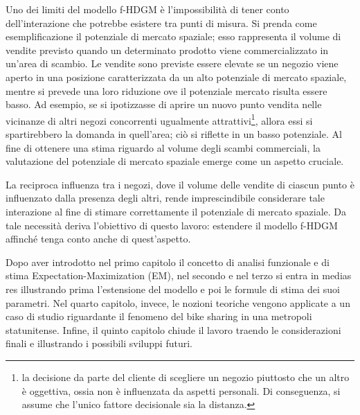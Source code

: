 \par Uno dei limiti del modello f-HDGM è l'impossibilità di tener conto dell'interazione che potrebbe esistere tra punti di misura. Si prenda come esemplificazione il potenziale di mercato spaziale; esso rappresenta il volume di vendite previsto quando un determinato prodotto viene commercializzato in un'area di scambio. Le vendite sono previste essere elevate se un negozio viene aperto in una posizione caratterizzata da un alto potenziale di mercato spaziale, mentre si prevede una loro riduzione ove il potenziale mercato risulta essere basso. Ad esempio, se si ipotizzasse di aprire un nuovo punto vendita nelle vicinanze di altri negozi concorrenti ugualmente attrattivi\footnote{la decisione da parte del cliente di scegliere un negozio piuttosto che un altro è oggettiva, ossia non è influenzata da aspetti personali. Di conseguenza, si assume che l'unico fattore decisionale sia la distanza.}, allora essi si spartirebbero la domanda in quell'area; ciò si riflette in un basso potenziale. Al fine di ottenere una stima riguardo al volume degli scambi commerciali, la valutazione del potenziale di mercato spaziale emerge come un aspetto cruciale. 
\par La reciproca influenza tra i negozi, dove il volume delle vendite di ciascun punto è influenzato dalla presenza degli altri, rende imprescindibile considerare tale interazione al fine di stimare correttamente il potenziale di mercato spaziale. Da tale necessità deriva l'obiettivo di questo lavoro: estendere il modello f-HDGM affinché tenga conto anche di quest'aspetto.
\par Dopo aver introdotto nel primo capitolo il concetto di analisi funzionale e di stima Expectation-Maximization (EM), nel secondo e nel terzo si entra in medias res illustrando prima l'estensione del modello e poi le formule di stima dei suoi parametri. Nel quarto capitolo, invece, le nozioni teoriche vengono applicate a un caso di studio riguardante il fenomeno del bike sharing in una metropoli statunitense. Infine, il quinto capitolo chiude il lavoro traendo le considerazioni finali e illustrando i possibili sviluppi futuri. 